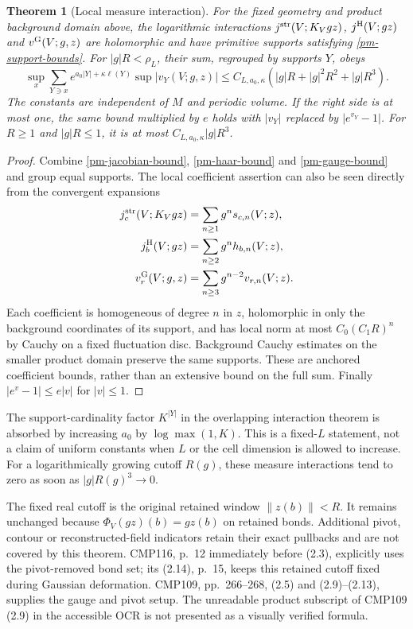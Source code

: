 \documentclass[11pt]{article}
\newtheorem{theorem}{Theorem}[section]
\begin{document}
\begin{theorem}[Local measure interaction]\label{pm-measure-theorem}
For the fixed geometry and product background domain above,
the logarithmic interactions
$j^{\rm str}(V;K_Vgz)$, $j^{\rm H}(V;gz)$ and
$v^{\rm G}(V;g,z)$ are holomorphic and have primitive
supports satisfying \eqref{pm-support-bounds}. For
$|g|R<\rho_L$, their sum, regrouped by supports $Y$, obeys
\begin{equation}\label{pm-combined-bound}
 \sup_x\sum_{Y\ni x}e^{a_0|Y|+\kappa\ell(Y)}
 \sup|v_Y(V;g,z)|
 \le C_{L,a_0,\kappa}
   (|g|R+|g|^2R^2+|g|R^3).
\end{equation}
The constants are independent of $M$ and periodic volume.
If the right side is at most one, the same bound multiplied
by $e$ holds with $|v_Y|$ replaced by $|e^{v_Y}-1|$.
For $R\ge1$ and $|g|R\le1$, it is at most
$C_{L,a_0,\kappa}|g|R^3$.
\end{theorem}
\begin{proof}
Combine \eqref{pm-jacobian-bound},
\eqref{pm-haar-bound} and \eqref{pm-gauge-bound} and group
equal supports. The local coefficient assertion can also
be seen directly from the convergent expansions
\[
 \begin{split}
 j_c^{\rm str}(V;K_Vgz)&=\sum_{n\ge1}g^n s_{c,n}(V;z),\\
 j_b^{\rm H}(V;gz)&=\sum_{n\ge2}g^n h_{b,n}(V;z),\\
 v_r^{\rm G}(V;g,z)&=\sum_{n\ge3}g^{n-2}v_{r,n}(V;z).
 \end{split}
\]
Each coefficient is homogeneous of degree $n$ in $z$,
holomorphic in only the background coordinates of its support,
and has local norm at most $C_0(C_1R)^n$ by Cauchy on a
fixed fluctuation disc. Background Cauchy estimates on the
smaller product domain preserve the same supports. These are
anchored coefficient bounds, rather than an extensive bound
on the full sum. Finally $|e^v-1|\le e|v|$ for $|v|\le1$.
\end{proof}

The support-cardinality factor $K^{|Y|}$ in the overlapping
interaction theorem is absorbed by increasing $a_0$ by
$\log\max(1,K)$. This is a fixed-$L$ statement, not a
claim of uniform constants when $L$ or the cell dimension is
allowed to increase. For a logarithmically growing cutoff
$R(g)$, these measure interactions tend to zero as soon as
$|g|R(g)^3\to0$.

The fixed real cutoff is the original retained window
$\|z(b)\|<R$. It remains unchanged because
$\Phi_V(gz)(b)=gz(b)$ on retained bonds. Additional pivot,
contour or reconstructed-field indicators retain their exact
pullbacks and are not covered by this theorem. CMP116,
p.~12 immediately before (2.3), explicitly uses the
pivot-removed bond set; its (2.14), p.~15, keeps this retained
cutoff fixed during Gaussian deformation. CMP109,
pp.~266--268, (2.5) and (2.9)--(2.13), supplies the gauge
and pivot setup. The unreadable product subscript of
CMP109 (2.9) in the accessible OCR is not presented as a
visually verified formula.
\end{document}
